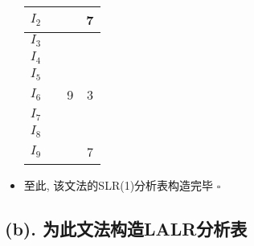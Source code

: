 \documentclass[UTF8]{article}
\begin{document}
\begin{itemize}
\begin{center}
\begin{tabular}{|c|c|c|c|}
	\hline
	$I_2$ &  &  & 7 \\
	\hline
	$I_3$ &  &  &  \\
	\hline
	$I_4$ &  &  &  \\
	\hline
	$I_5$ &  &  &  \\
	\hline
	$I_6$ &  & 9 & 3 \\
	\hline
	$I_7$ &  &  &  \\
	\hline
	$I_8$ &  &  &  \\
	\hline
	$I_9$ &  &  & 7 \\
	\hline
	\end{tabular}
	\end{center}
\item 至此, 该文法的SLR(1)分析表构造完毕
\hfill$\square$
\end{itemize}

\subsection*{(b). 为此文法构造LALR分析表}
\end{document}
